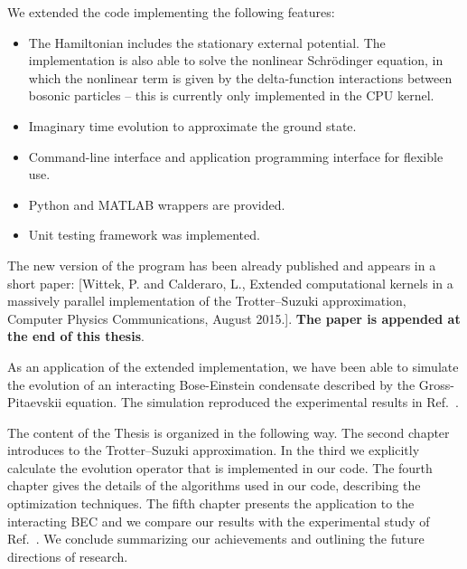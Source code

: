 We extended the code implementing the following features:
\begin{itemize}
\item The Hamiltonian includes the stationary external potential. The implementation is also able to solve the nonlinear Schr\"odinger equation, in which the nonlinear term is given by the delta-function interactions between bosonic particles -- this is currently only implemented in the CPU kernel.

\item Imaginary time evolution to approximate the ground state.

\item Command-line interface and application programming interface for flexible use.

\item Python and MATLAB wrappers are provided.

\item Unit testing framework was implemented.

\end{itemize}
The new version of the program has been already published and appears in a short paper: [Wittek, P. and Calderaro, L., Extended computational kernels in a massively parallel implementation of the Trotter--Suzuki approximation, Computer Physics Communications, August 2015.]. \textbf{The paper is appended at the end of this thesis}.

As an application of the extended implementation, we have been able to simulate the evolution of an interacting Bose-Einstein condensate described by the Gross-Pitaevskii equation. The simulation reproduced the experimental results in Ref.~\citep{DSF00}.

The content of the Thesis is organized in the following way. The second chapter introduces to the Trotter--Suzuki approximation. In the third we explicitly calculate the evolution operator that is implemented in our code. The fourth chapter gives the details of the algorithms used in our code, describing the optimization techniques. The fifth chapter presents the application to the interacting BEC and we compare our results with the experimental study of Ref.~\citep{DSF00}. We conclude summarizing our achievements and outlining the future directions of research.